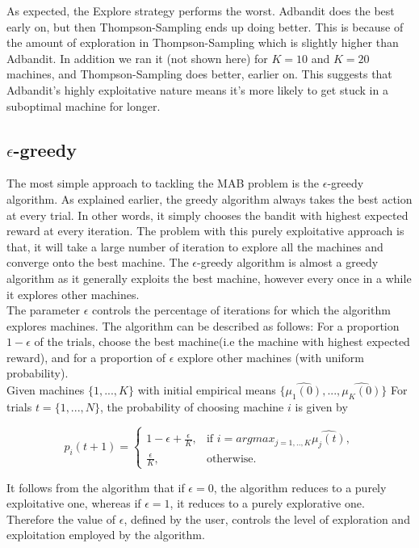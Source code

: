 \documentclass{article}
\begin{document}
As expected, the Explore strategy performs the worst. Adbandit does the best early on, but then Thompson-Sampling ends up doing better. This is because of the amount of exploration in Thompson-Sampling which is slightly higher than Adbandit. In addition we ran it (not shown here) for $K=10$ and $K=20$ machines, and Thompson-Sampling does better, earlier on. This suggests that Adbandit's highly exploitative nature means it's more likely to get stuck in a suboptimal machine for longer.

\subsection{$\epsilon$-greedy}

The most simple approach to tackling the MAB problem is the $\epsilon$-greedy algorithm. As explained earlier, the greedy algorithm always takes the best action at every trial. In other words, it simply chooses the bandit with highest expected reward at every iteration. The problem with this purely exploitative approach is that, it will take a large number of iteration to explore all the machines and converge onto the best machine. The $\epsilon$-greedy algorithm is almost a greedy algorithm as it generally exploits the best machine, however every once in a while it explores other machines.\\ 

The parameter $\epsilon$ controls the percentage of iterations for which the algorithm explores machines. The algorithm can be described as follows: For a proportion $1 - \epsilon$ of the trials, choose the best machine(i.e the machine with highest expected reward), and for a proportion of $\epsilon$ explore other machines (with uniform probability).\\

Given machines $\{1,...,K\}$ with initial empirical means $\{\hat{\mu_1(0)},...,\hat{\mu_K(0)}\}$ For trials $t = \{1,...,N\}$, the probability of choosing machine $i$ is given by

$$p_i(t+1) = \begin{cases}
  1- \epsilon + \frac{\epsilon}{K}, & \text{if } i = argmax_{j=1,..,K}\hat{\mu_j(t)}, \\
  \frac{\epsilon}{K}, & \text{otherwise}.
\end{cases}$$


It follows from the algorithm that if $\epsilon = 0$, the algorithm reduces to a purely exploitative one, whereas if $\epsilon = 1$, it reduces to a purely explorative one. Therefore the value of $\epsilon$, defined by the user, controls the level of exploration and exploitation employed by the algorithm.\\
\end{document}
